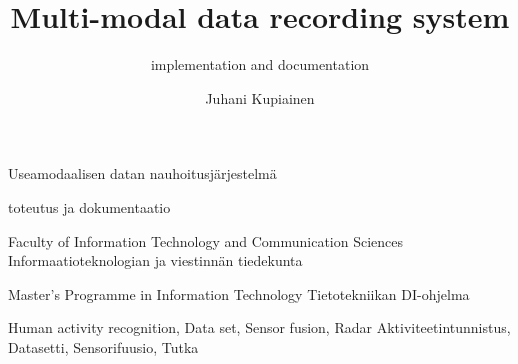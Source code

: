 \documentclass[english, numeric, fleqn]{tauthesis}
\begin{document}

\frontmatter


\title{Multi-modal data recording system}
    {Useamodaalisen datan nauhoitusjärjestelmä}
\subtitle{implementation and documentation}
    {toteutus ja dokumentaatio}

\author{Juhani Kupiainen}


\finishdate{\year}{\month}{\day}


\facultyname
{ Faculty of Information Technology and Communication Sciences }
{ Informaatioteknologian ja viestinnän tiedekunta }

\programmename
{ Master's Programme in Information Technology }
{ Tietotekniikan DI-ohjelma }

\keywords%
    { Human activity recognition, Data set, Sensor fusion, Radar }
    { Aktiviteetintunnistus, Datasetti, Sensorifuusio, Tutka }

\maketitle

\end{document}
